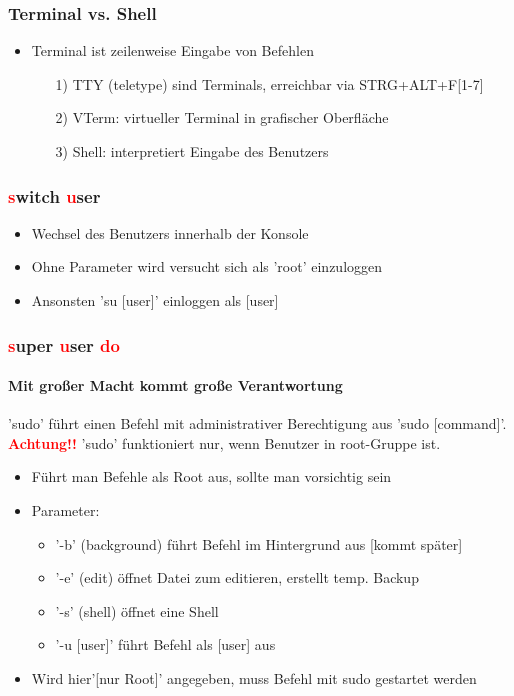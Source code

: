 \documentclass[12pt,utf8, handout]{beamer}
\begin{document}
\begin{frame}
\frametitle{Terminal vs. Shell}
\begin{itemize}
	\item Terminal ist zeilenweise Eingabe von Befehlen
	\begin{itemize}
		\item[1)] TTY (teletype) sind Terminals, erreichbar via STRG+ALT+F[1-7]
		\item[2)] VTerm: virtueller Terminal in grafischer Oberfläche
		\item[3)] Shell: interpretiert Eingabe des Benutzers
	\end{itemize}
\end{itemize}
\end{frame}

\begin{frame}
\frametitle{\textcolor{red}{s}witch \textcolor{red}{u}ser}
\begin{itemize}
	\item Wechsel des Benutzers innerhalb der Konsole
	\item Ohne Parameter wird versucht sich als 'root' einzuloggen
	\item Ansonsten 'su [user]' einloggen als [user]
\end{itemize}
\end{frame}

\begin{frame}
\frametitle{\textcolor{red}{s}uper \textcolor{red}{u}ser \textcolor{red}{do}}
\framesubtitle{\textcolor{ownDarkOr}{Mit großer Macht kommt große Verantwortung}}
'sudo' führt einen Befehl mit administrativer Berechtigung aus 'sudo [command]'.
\textbf{\textcolor{red}{Achtung!!}} 'sudo' funktioniert nur, wenn Benutzer in root-Gruppe ist.
\begin{itemize}[<+->]
	\item Führt man Befehle als Root aus, sollte man vorsichtig sein
	\item Parameter:
	\begin{itemize}[<+->]
		\item {\scriptsize'-b' (background) führt Befehl im Hintergrund aus [kommt später]}
		\item {\scriptsize '-e' (edit) öffnet Datei zum editieren, erstellt temp. Backup}
		\item {\scriptsize '-s' (shell) öffnet eine Shell}
		\item {\scriptsize '-u [user]' führt Befehl als [user] aus}
	\end{itemize}
	\item Wird hier'[nur Root]' angegeben, muss Befehl mit sudo gestartet werden
\end{itemize}
\end{frame}
\end{document}
